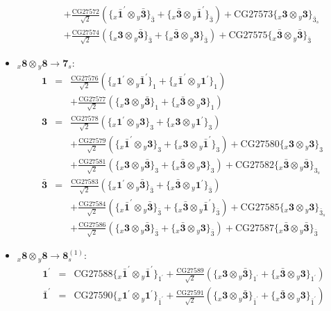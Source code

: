 \documentclass[english]{article}
\newcommand{\rep}[1]{\mathbf{#1}}
\newcommand{\repx}[2]{{}_{#2}\mathbf{#1}}
\newcommand{\subcg}[3]{\big\{ \repx{#1}{x}\otimes\repx{#2}{y}\big\}^{}_{#3}}
\begin{document}
\begin{itemize}
\begin{eqnarray*}
 & & +\frac{\text{CG27572}}{\sqrt{2}}\left(\subcg{\bar{1}^{\prime}}{\bar{3}}{\bar{3}}+\subcg{\bar{3}}{\bar{1}^{\prime}}{\bar{3}}\right)+\text{CG27573}\subcg{3}{3}{\bar{3}_{s}} \\ 
 & & +\frac{\text{CG27574}}{\sqrt{2}}\left(\subcg{3}{\bar{3}}{\bar{3}}+\subcg{\bar{3}}{3}{\bar{3}}\right)+\text{CG27575}\subcg{\bar{3}}{\bar{3}}{\bar{3}}
\end{eqnarray*}
\item $\repx{8}{x}\otimes\repx{8}{y}\to\rep{7}_{s}$:
\begin{eqnarray*}
\rep{1} &=& \frac{\text{CG27576}}{\sqrt{2}}\left(\subcg{1^{\prime}}{\bar{1}^{\prime}}{1}+\subcg{\bar{1}^{\prime}}{1^{\prime}}{1}\right) \\ 
 & & +\frac{\text{CG27577}}{\sqrt{2}}\left(\subcg{3}{\bar{3}}{1}+\subcg{\bar{3}}{3}{1}\right)
\\
\rep{3} &=& \frac{\text{CG27578}}{\sqrt{2}}\left(\subcg{1^{\prime}}{3}{3}+\subcg{3}{1^{\prime}}{3}\right) \\ 
 & & +\frac{\text{CG27579}}{\sqrt{2}}\left(\subcg{\bar{1}^{\prime}}{3}{3}+\subcg{3}{\bar{1}^{\prime}}{3}\right)+\text{CG27580}\subcg{3}{3}{3} \\ 
 & & +\frac{\text{CG27581}}{\sqrt{2}}\left(\subcg{3}{\bar{3}}{3}+\subcg{\bar{3}}{3}{3}\right)+\text{CG27582}\subcg{\bar{3}}{\bar{3}}{3_{s}}
\\
\rep{\bar{3}} &=& \frac{\text{CG27583}}{\sqrt{2}}\left(\subcg{1^{\prime}}{\bar{3}}{\bar{3}}+\subcg{\bar{3}}{1^{\prime}}{\bar{3}}\right) \\ 
 & & +\frac{\text{CG27584}}{\sqrt{2}}\left(\subcg{\bar{1}^{\prime}}{\bar{3}}{\bar{3}}+\subcg{\bar{3}}{\bar{1}^{\prime}}{\bar{3}}\right)+\text{CG27585}\subcg{3}{3}{\bar{3}_{s}} \\ 
 & & +\frac{\text{CG27586}}{\sqrt{2}}\left(\subcg{3}{\bar{3}}{\bar{3}}+\subcg{\bar{3}}{3}{\bar{3}}\right)+\text{CG27587}\subcg{\bar{3}}{\bar{3}}{\bar{3}}
\end{eqnarray*}
\item $\repx{8}{x}\otimes\repx{8}{y}\to\rep{8}_{s}^{(1)}$:
\begin{eqnarray*}
\rep{1^{\prime}} &=& \text{CG27588}\subcg{\bar{1}^{\prime}}{\bar{1}^{\prime}}{1^{\prime}}+\frac{\text{CG27589}}{\sqrt{2}}\left(\subcg{3}{\bar{3}}{1^{\prime}}+\subcg{\bar{3}}{3}{1^{\prime}}\right)
\\
\rep{\bar{1}^{\prime}} &=& \text{CG27590}\subcg{1^{\prime}}{1^{\prime}}{\bar{1}^{\prime}}+\frac{\text{CG27591}}{\sqrt{2}}\left(\subcg{3}{\bar{3}}{\bar{1}^{\prime}}+\subcg{\bar{3}}{3}{\bar{1}^{\prime}}\right)

\end{eqnarray*}
\end{itemize}
\end{document}
